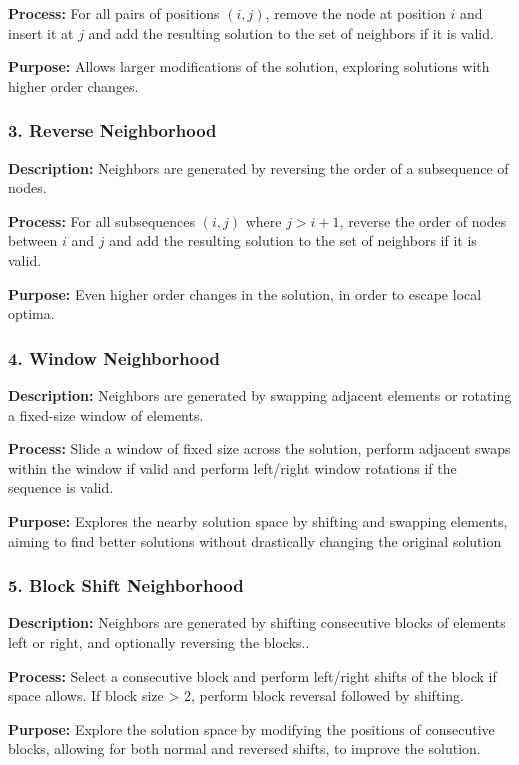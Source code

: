 \documentclass{article}
\begin{document}
\noindent \textbf{Process:} For all pairs of positions \( (i, j) \), remove the node at position \( i \) and insert it at \( j \) and add the resulting solution to the set of neighbors if it is valid.

\noindent \textbf{Purpose:} Allows larger modifications of the solution, exploring solutions with higher order changes.

\subsubsection*{3. Reverse Neighborhood}
\textbf{Description:} Neighbors are generated by reversing the order of a subsequence of nodes.

\noindent \textbf{Process:} For all subsequences \( (i, j) \) where \( j > i + 1 \), reverse the order of nodes between \( i \) and \( j \) and add the resulting solution to the set of neighbors if it is valid.

\noindent \textbf{Purpose:} Even higher order changes in the solution, in order to escape local optima.

\subsubsection*{4. Window Neighborhood}
\textbf{Description:} Neighbors are generated by swapping adjacent elements or rotating a fixed-size window of elements.

\noindent \textbf{Process:} Slide a window of fixed size across the solution, perform adjacent swaps within the window if valid and perform left/right window rotations if the sequence is valid.

\noindent \textbf{Purpose:} Explores the nearby solution space by shifting and swapping elements, aiming to find better solutions without drastically changing the original solution

\subsubsection*{5. Block Shift Neighborhood}
\textbf{Description:} Neighbors are generated by shifting consecutive blocks of elements left or right, and optionally reversing the blocks..

\noindent \textbf{Process:} Select a consecutive block and perform left/right shifts of the block if space allows. If block size > 2, perform block reversal followed by shifting.

\noindent \textbf{Purpose:} Explore the solution space by modifying the positions of consecutive blocks, allowing for both normal and reversed shifts, to improve the solution.
\end{document}
